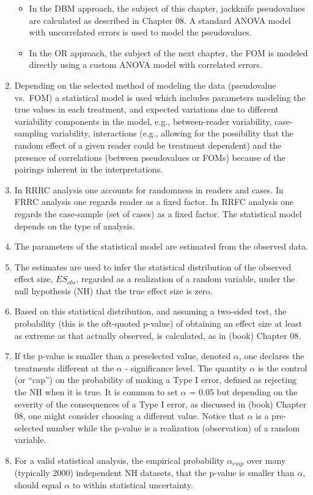 \documentclass[
]{book}
\providecommand{\tightlist}{%
  \setlength{\itemsep}{0pt}\setlength{\parskip}{0pt}}
\begin{document}
\begin{enumerate}
  \begin{itemize}
  \tightlist
  \item
    In the DBM approach, the subject of this chapter, jackknife pseudovalues are calculated as described in Chapter 08. A standard ANOVA model with uncorrelated errors is used to model the pseudovalues.
  \item
    In the OR approach, the subject of the next chapter, the FOM is modeled directly using a custom ANOVA model with correlated errors.
  \end{itemize}
\item
  Depending on the selected method of modeling the data (pseudovalue vs.~FOM) a statistical model is used which includes parameters modeling the true values in each treatment, and expected variations due to different variability components in the model, e.g., between-reader variability, case-sampling variability, interactions (e.g., allowing for the possibility that the random effect of a given reader could be treatment dependent) and the presence of correlations (between pseudovalues or FOMs) because of the pairings inherent in the interpretations.
\item
  In RRRC analysis one accounts for randomness in readers and cases. In FRRC analysis one regards reader as a fixed factor. In RRFC analysis one regards the case-sample (set of cases) as a fixed factor. The statistical model depends on the type of analysis.
\item
  The parameters of the statistical model are estimated from the observed data.
\item
  The estimates are used to infer the statistical distribution of the observed effect size, \(ES_{obs}\), regarded as a realization of a random variable, under the null hypothesis (NH) that the true effect size is zero.
\item
  Based on this statistical distribution, and assuming a two-sided test, the probability (this is the oft-quoted p-value) of obtaining an effect size at least as extreme as that actually observed, is calculated, as in (book) Chapter 08.
\item
  If the p-value is smaller than a preselected value, denoted \(\alpha\), one declares the treatments different at the \(\alpha\) - significance level. The quantity \(\alpha\) is the control (or ``cap'') on the probability of making a Type I error, defined as rejecting the NH when it is true. It is common to set \(\alpha\) = 0.05 but depending on the severity of the consequences of a Type I error, as discussed in (book) Chapter 08, one might consider choosing a different value. Notice that \(\alpha\) is a pre-selected number while the p-value is a realization (observation) of a random variable.
\item
  For a valid statistical analysis, the empirical probability \(\alpha_{emp}\) over many (typically 2000) independent NH datasets, that the p-value is smaller than \(\alpha\), should equal \(\alpha\) to within statistical uncertainty.
\end{enumerate}
\end{document}
